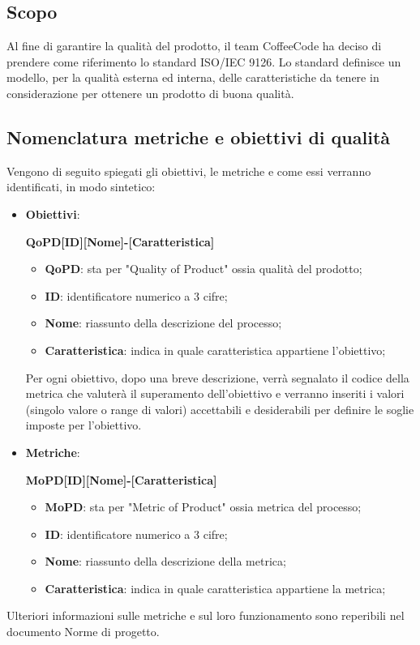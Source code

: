 \documentclass[../piano-di-qualifica.tex]{subfiles}
\begin{document}
\subsection{Scopo}%
\label{sec:scopo}
Al fine di garantire la qualità del prodotto, il team CoffeeCode ha deciso di prendere come riferimento lo standard ISO/IEC 9126.
Lo standard definisce un modello, per la qualità esterna ed interna, delle caratteristiche da tenere in considerazione per ottenere un prodotto di buona qualità.

\subsection{Nomenclatura metriche e obiettivi di qualità}%
\label{sub:nomenclatura_metriche_e_obiettivi_di_qualita}
Vengono di seguito spiegati gli obiettivi, le metriche e come essi verranno identificati, in modo sintetico:
\begin{itemize}
    \item \textbf{Obiettivi}: 
    \begin{center}
        \centering
        \textbf{QoPD[ID][Nome]-[Caratteristica]}%
    \end{center} 
        \begin{itemize}
            \item \textbf{QoPD}: sta per "Quality of Product" ossia qualità del prodotto;
            \item \textbf{ID}: identificatore numerico a 3 cifre;
            \item \textbf{Nome}: riassunto della descrizione del processo;
            \item \textbf{Caratteristica}: indica in quale caratteristica appartiene l'obiettivo;
        \end{itemize}
        Per ogni obiettivo, dopo una breve descrizione, verrà segnalato il codice della metrica che valuterà il superamento dell'obiettivo e verranno inseriti i valori (singolo valore o range di valori) accettabili e desiderabili per definire le soglie imposte per l'obiettivo.
    \item \textbf{Metriche}: 
    \begin{center}
        \centering
        \textbf{MoPD[ID][Nome]-[Caratteristica]}%
    \end{center} 
        \begin{itemize}
            \item \textbf{MoPD}: sta per "Metric of Product" ossia metrica del processo;
            \item \textbf{ID}: identificatore numerico a 3 cifre;
            \item \textbf{Nome}: riassunto della descrizione della metrica;
            \item \textbf{Caratteristica}: indica in quale caratteristica appartiene la metrica;
        \end{itemize}
\end{itemize}  
Ulteriori informazioni sulle metriche e sul loro funzionamento sono reperibili nel documento Norme di progetto.
\end{document}
